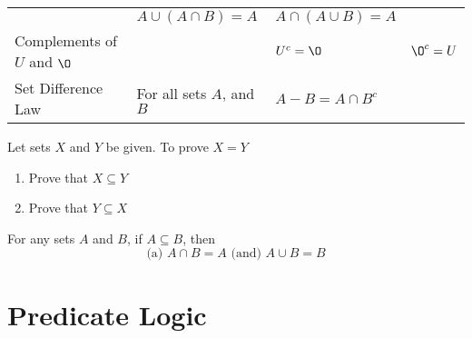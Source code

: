 \documentclass[11pt]{article}
\begin{document}
\begin{table}[!htbp]
\begin{adjustwidth}{-1.5cm}{-1.5cm}
{\begin{tabular}{ *{4}{l} }
                                    & $A \cup (A \cap B) = A$
                                    & $A \cap (A \cup B) = A$ \\
            Complements of
                $U$ and $\O$        &
                                    & $U^c = \O$
                                    & $\O^c = U$ \\
                Set Difference Law  & For all sets $A$, and $B$
                                    & $A - B = A \cap B^c$
                                    & \\
            \bottomrule
        \end{tabular}
        \label{tab:tbl-set-identities}
        }
        \end{adjustwidth}
    \end{table}

\begin{definition}\label{def:prove-set-eq}
    Let sets $X$ and $Y$ be given. To prove $X = Y$
    \begin{enumerate}
        \item Prove that $X \subseteq Y$
        \item Prove that $Y \subseteq X$
    \end{enumerate}
\end{definition}

\begin{definition}\label{def:intersect-union-subset}
    For any sets $A$ and $B$, if $A \subseteq B$, then
    \begin{equation*}
        \text{(a) } A \cap B = A \text{ (and) } A \cup B = B
    \end{equation*}
\end{definition}


\newpage
\section{Predicate Logic}
\end{document}
